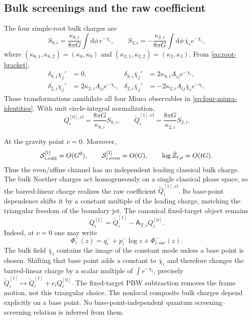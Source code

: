 \documentclass[11pt,a4paper]{article}
\numberwithin{equation}{section}
\theoremstyle{remark}
\newcommand{\cl}{\mathrm{cl}}
\newcommand{\T}{\mathrm{T}}
\newcommand{\dd}{\mathrm{d}}
\newcommand{\cS}{\mathcal S}
\begin{document}
\subsection{Bulk screenings and the raw coefficient}

The four simple-root bulk charges are
\begin{equation}
 S_{8,i}=\frac{\kappa_{8,i}}{8\pi G}\int\dd\phi\,e^{-\chi_i},
 \qquad
 S_{2,i}=-\frac{\kappa_{2,i}}{8\pi G}\int\dd\phi\,
 \bar\chi_i e^{-\chi_i},
 \label{eq:bulk-screenings}
\end{equation}
where $(\kappa_{8,1},\kappa_{8,2})=(\kappa_8,\kappa_9)$ and
$(\kappa_{2,1},\kappa_{2,2})=(\kappa_2,\kappa_3)$.  From
\cref{eq:root-bracket},
\begin{align}
 \delta_{8,i}\chi_j'&=0,&
 \delta_{8,i}\bar\chi_j'&=2\kappa_{8,i}A_{ij}e^{-\chi_i},
 \label{eq:bulk-leading-transform}\\
 \delta_{2,i}\chi_j'&=2\kappa_{2,i}A_{ij}e^{-\chi_i},&
 \delta_{2,i}\bar\chi_j'&=-2\kappa_{2,i}A_{ij}\bar\chi_i e^{-\chi_i}.
 \label{eq:bulk-tangent-transform}
\end{align}
These transformations annihilate all four Miura observables in
\cref{eq:four-miura-identities}.  With unit circle-integral normalization,
\begin{equation}
 Q_i^{[0],\cl}=\frac{8\pi G}{\kappa_{8,i}}S_{8,i},
 \qquad
 \widetilde Q_i^{[1],\cl}=\frac{8\pi G}{\kappa_{2,i}}S_{2,i}.
 \label{eq:bulk-charge-map}
\end{equation}

At the gravity point $\nu=0$.  Moreover,
\begin{equation}
 \cS_{i,\rm odd}^{[1]}=O(G^0),\qquad
 \cS_{i,\rm even}^{[1]}=O(G),\qquad
 \log\bar Z_{t,\rho}=O(tG).
 \label{eq:bulk-power-counting}
\end{equation}
Thus the even/affine channel has no independent leading classical bulk charge.  The bulk
Noether charges act homogeneously on a single classical phase space, so the barred-linear
charge realizes the raw coefficient $\widetilde Q_i^{[1],\cl}$.  Its base-point dependence shifts
it by a constant multiple of the leading charge, matching the triangular freedom of the
boundary jet.  The canonical fixed-target object remains
\begin{equation}
 Q_i^{[1]}=\widetilde Q_i^{[1]}-\mathsf A_{\T,i}Q_i^{[0]}.
 \label{eq:bulk-frame-conclusion}
\end{equation}
Indeed, at $\nu=0$ one may write
\begin{equation}
 \Phi_i^-(z)=q_i^-+p_i^-\log z+\Phi_{i,\mathrm{osc}}^-(z).
 \label{eq:minus-zero-mode-splitting}
\end{equation}
The bulk field $\bar\chi_i$ contains the image of the constant mode unless a base point is
chosen.  Shifting that base point adds a constant to $\bar\chi_i$ and therefore changes the
barred-linear charge by a scalar multiple of $\int e^{-\chi_i}$, precisely
$\widetilde Q_i^{[1]}\mapsto\widetilde Q_i^{[1]}+c_iQ_i^{[0]}$.  The fixed-target PBW
subtraction removes the frame motion, not this triangular choice.
The nonlocal composite bulk charges depend explicitly on a base point.  No
base-point-independent quantum screening--screening relation is inferred from them.
\end{document}
